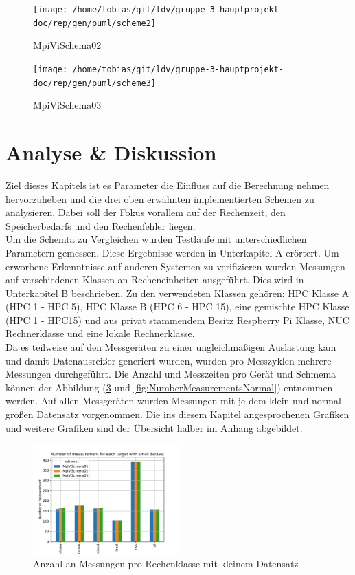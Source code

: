 \begin{figure}[h]
	\centering
	\texttt{[image: /home/tobias/git/ldv/gruppe-3-hauptprojekt-doc/rep/gen/puml/scheme2]}
	\caption{MpiViSchema02}
	\label{fig:mpiViSchema02}
\end{figure}

\begin{figure}[h]
	\centering
	\texttt{[image: /home/tobias/git/ldv/gruppe-3-hauptprojekt-doc/rep/gen/puml/scheme3]}
	\caption{MpiViSchema03}
	\label{fig:mpiViSchema03}
\end{figure}

\section{Analyse \& Diskussion}
\label{sec:analyse_diskussion}
Ziel dieses Kapitels ist es Parameter die Einfluss auf die Berechnung nehmen hervorzuheben und die drei oben erw\"ahnten implementierten Schemen zu analysieren. Dabei soll der Fokus vorallem auf der Rechenzeit, den Speicherbedarfs und den Rechenfehler liegen. \\ Um die  Schemta zu Vergleichen wurden Testl\"aufe mit unterschiedlichen Parametern gemessen. Diese Ergebnisse werden in Unterkapitel A er\"ortert. Um erworbene Erkenntnisse auf anderen Systemen zu verifizieren wurden Messungen auf verschiedenen Klassen an Recheneinheiten ausgef\"uhrt. Dies wird in Unterkapitel B beschrieben. Zu den verwendeten Klassen geh\"oren: HPC Klasse A (HPC 1 - HPC 5), HPC Klasse B (HPC 6 - HPC 15), eine gemischte HPC Klasse (HPC 1 - HPC15) und aus privat stammendem Besitz  Respberry Pi Klasse, NUC Rechnerklasse und eine lokale Rechnerklasse. \\ Da es teilweise auf den Messger\"aten zu einer ungleichm\"a\ss{}igen Auslastung kam und damit Datenausrei\ss{}er generiert wurden, wurden pro Messzyklen mehrere Messungen durchgef\"uhrt. Die Anzahl und Messzeiten pro Ger\"at und Schmema k\"onnen der Abbildung (\ref{fig:NumberMeasurementsSmall} und \ref{fig:NumberMeasurementsNormal}) entnommen werden. Auf allen Messger\"aten wurden Messungen mit je dem klein und normal gro\ss{}en Datensatz vorgenommen. Die ins diesem Kapitel angesprochenen Grafiken und weitere Grafiken sind der \"Ubersicht halber im Anhang abgebildet.

\begin{figure}[h]
	\includegraphics[width=0.5\textwidth]{./gen/img/ds/small/number_measurement_target.pdf}
	\caption{Anzahl an Messungen pro Rechenklasse mit kleinem Datensatz}
	\label{fig:NumberMeasurementsSmall}
\end{figure}

